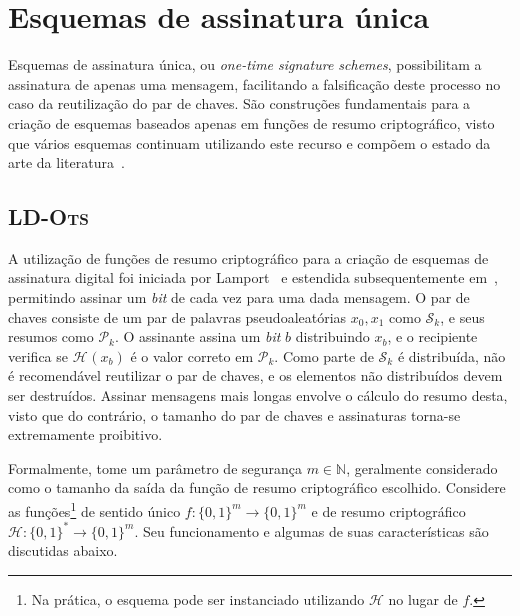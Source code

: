 \documentclass{ufsctex/ufsctex}
\newcommand{\hh}{\mathcal{H}}
\newcommand{\pk}{\mathcal{P}_{k}}
\newcommand{\sk}{\mathcal{S}_{k}}
\newcommand{\hash}[2][]{\mathcal{H}^{#1} (#2)}
\newcommand{\binwds}[1]{\{0, 1\}^{#1}}
\newcommand{\fhash}[1]{\hh{}: \binwds{*} \longrightarrow{} \binwds{#1}}
\newcommand{\lots}{\textsc{LD-Ots}}
\begin{document}
\section{Esquemas de assinatura única}\label{section:onetime}

Esquemas de assinatura única, ou \emph{one-time signature schemes},
possibilitam a assinatura de apenas uma mensagem, facilitando a falsificação
deste processo no caso da reutilização do par de chaves. São construções
fundamentais para a criação de esquemas baseados apenas em funções de resumo
criptográfico, visto que vários esquemas continuam utilizando este recurso e
compõem o estado da arte da
literatura~\cite{Bernstein:misc:2017:dec,Huelsing:report:2018:may}.

\subsection{\lots{}}\label{subsection:ldots}

A utilização de funções de resumo criptográfico para a criação de esquemas de
assinatura digital foi iniciada por Lamport~\cite{Lamport:report:1979:oct} e
estendida subsequentemente em~\cite{Diffie:article:1976:sep,
Merkle:inproc:1989:aug}, permitindo assinar um \emph{bit} de cada vez para uma
dada mensagem. O par de chaves consiste de um par de palavras pseudoaleatórias
$x_{0}, x_{1}$ como $\sk{}$, e seus resumos como $\pk{}$. O assinante assina um
\emph{bit} $b$ distribuindo $x_{b}$, e o recipiente verifica se $\hash{x_{b}}$
é o valor correto em $\pk{}$. Como parte de $\sk{}$ é distribuída, não é
recomendável reutilizar o par de chaves, e os elementos não distribuídos devem
ser destruídos. Assinar mensagens mais longas envolve o cálculo do resumo
desta, visto que do contrário, o tamanho do par de chaves e assinaturas
torna-se extremamente proibitivo.

Formalmente, tome um parâmetro de segurança $m \in \mathbb{N}$, geralmente
considerado como o tamanho da saída da função de resumo criptográfico
escolhido. Considere as funções\footnote{Na prática, o esquema pode ser
instanciado utilizando $\hh{}$ no lugar de $f$.} de sentido único $f : \binwds{m}
\longrightarrow \binwds{m}$ e de resumo criptográfico $\fhash{m}$. Seu
funcionamento e algumas de suas características são discutidas abaixo.
\end{document}
